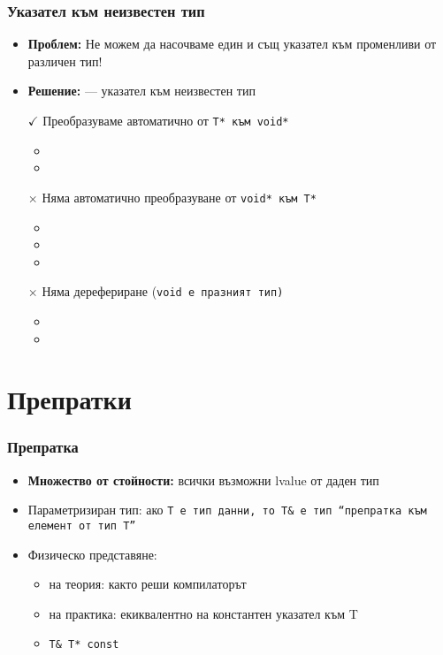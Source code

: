 \documentclass[alsotrans]{beamerswitch}
\begin{document}
\begin{frame}
  \frametitle{Указател към неизвестен тип}

  \begin{itemize}[<+->]
  \item \textbf{Проблем:} Не можем да насочваме един и същ указател към променливи от различен тип!
  \item \textbf{Решение:}  --- указател към неизвестен тип
  \item[$\checkmark$] Преобразуваме автоматично от \tt{T*} към \tt{void*}
    \begin{itemize}
    \item {}
    \item {}
    \end{itemize}
  \item[$\times$] \alert{Няма} автоматично преобразуване от \tt{void*} към \tt{T*}
    \begin{itemize}
    \item {}
    \item {}
    \item {}
    \end{itemize}
  \item[$\times$] \alert{Няма} дерефериране (\tt{void} е празният тип)
    \begin{itemize}
    \item {}
    \item {}
    \end{itemize}
  \end{itemize}
\end{frame}

\section{Препратки}

\begin{frame}
  \frametitle{Препратка}

  \begin{itemize}[<+->]
  \item \textbf{Множество от стойности:} всички възможни lvalue от даден тип
  \item Параметризиран тип: ако \tt T е тип данни, то \tt{T\&} е тип ``препратка към елемент от тип \tt T''
  \item Физическо представяне:
    \begin{itemize}
    \item на теория: както реши компилаторът
    \item на практика: екиквалентно на \alert{константен указател към T}
    \item \tt{T\& \eqv T* const}
    \end{itemize}
  \end{itemize}
\end{frame}
\end{document}
